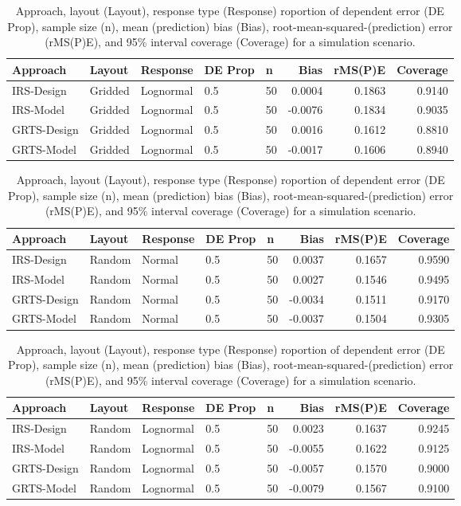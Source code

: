 \documentclass[]{elsarticle} %
\begin{document}
\begin{table}[ht]
\centering
\begin{tabular}{lllllrrr}
  \hline
Approach & Layout & Response & DE Prop & n & Bias & rMS(P)E & Coverage \\ 
  \hline
IRS-Design & Gridded & Lognormal & 0.5 & 50 & 0.0004 & 0.1863 & 0.9140 \\ 
  IRS-Model & Gridded & Lognormal & 0.5 & 50 & -0.0076 & 0.1834 & 0.9035 \\ 
  GRTS-Design & Gridded & Lognormal & 0.5 & 50 & 0.0016 & 0.1612 & 0.8810 \\ 
  GRTS-Model & Gridded & Lognormal & 0.5 & 50 & -0.0017 & 0.1606 & 0.8940 \\ 
   \hline
\end{tabular}
\caption{Approach, layout (Layout), response type (Response) roportion of dependent error (DE Prop), sample size (n), mean (prediction) bias (Bias), root-mean-squared-(prediction) error (rMS(P)E), and 95\% interval coverage (Coverage) for a simulation scenario.} 
\end{table}
\begin{table}[ht]
\centering
\begin{tabular}{lllllrrr}
  \hline
Approach & Layout & Response & DE Prop & n & Bias & rMS(P)E & Coverage \\ 
  \hline
IRS-Design & Random & Normal & 0.5 & 50 & 0.0037 & 0.1657 & 0.9590 \\ 
  IRS-Model & Random & Normal & 0.5 & 50 & 0.0027 & 0.1546 & 0.9495 \\ 
  GRTS-Design & Random & Normal & 0.5 & 50 & -0.0034 & 0.1511 & 0.9170 \\ 
  GRTS-Model & Random & Normal & 0.5 & 50 & -0.0037 & 0.1504 & 0.9305 \\ 
   \hline
\end{tabular}
\caption{Approach, layout (Layout), response type (Response) roportion of dependent error (DE Prop), sample size (n), mean (prediction) bias (Bias), root-mean-squared-(prediction) error (rMS(P)E), and 95\% interval coverage (Coverage) for a simulation scenario.} 
\end{table}
\begin{table}[ht]
\centering
\begin{tabular}{lllllrrr}
  \hline
Approach & Layout & Response & DE Prop & n & Bias & rMS(P)E & Coverage \\ 
  \hline
IRS-Design & Random & Lognormal & 0.5 & 50 & 0.0023 & 0.1637 & 0.9245 \\ 
  IRS-Model & Random & Lognormal & 0.5 & 50 & -0.0055 & 0.1622 & 0.9125 \\ 
  GRTS-Design & Random & Lognormal & 0.5 & 50 & -0.0057 & 0.1570 & 0.9000 \\ 
  GRTS-Model & Random & Lognormal & 0.5 & 50 & -0.0079 & 0.1567 & 0.9100 \\ 
   \hline
\end{tabular}
\caption{Approach, layout (Layout), response type (Response) roportion of dependent error (DE Prop), sample size (n), mean (prediction) bias (Bias), root-mean-squared-(prediction) error (rMS(P)E), and 95\% interval coverage (Coverage) for a simulation scenario.} 
\end{table}
\end{document}
